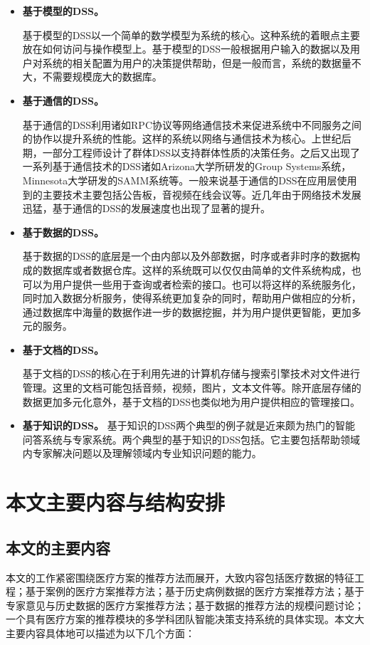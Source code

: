 \begin{itemize}
\item \textbf{基于模型的DSS。}

基于模型的DSS以一个简单的数学模型为系统的核心。这种系统的着眼点主要放在如何访问与操作模型上。基于模型的DSS一般根据用户输入的数据以及用户对系统的相关配置为用户的决策提供帮助，但是一般而言，系统的数据量不大，不需要规模庞大的数据库。
\item \textbf{基于通信的DSS。}

基于通信的DSS利用诸如RPC协议\cite{Srinivasan1995RPC}等网络通信技术来促进系统中不同服务之间的协作以提升系统的性能。这样的系统以网络与通信技术为核心。上世纪后期，一部分工程师设计了群体DSS以支持群体性质的决策任务\cite{Turoff1982Computer}。之后又出现了一系列基于通信技术的DSS诸如Arizona大学所研发的Group Systems系统，Minnesota大学研发的SAMM系统等。一般来说基于通信的DSS在应用层使用到的主要技术主要包括公告板，音视频在线会议等。近几年由于网络技术发展迅猛，基于通信的DSS的发展速度也出现了显著的提升。

\item \textbf{基于数据的DSS。}

基于数据的DSS的底层是一个由内部以及外部数据，时序或者非时序的数据构成的数据库或者数据仓库\cite{Stumme2000Conceptual}。这样的系统既可以仅仅由简单的文件系统构成，也可以为用户提供一些用于查询或者检索的接口。也可以将这样的系统服务化，同时加入数据分析服务，使得系统更加复杂的同时，帮助用户做相应的分析，通过数据库中海量的数据作进一步的数据挖掘，并为用户提供更智能，更加多元的服务。
\item \textbf{基于文档的DSS。}

基于文档的DSS的核心在于利用先进的计算机存储与搜索引擎技术对文件进行管理。这里的文档可能包括音频，视频，图片，文本文件等。除开底层存储的数据更加多元化意外，基于文档的DSS也类似地为用户提供相应的管理接口。

\item \textbf{基于知识的DSS。}
基于知识的DSS两个典型的例子就是近来颇为热门的智能问答系统与专家系统\cite{Buchanan1984Rule,Gonzalez1985The}。两个典型的基于知识的DSS包括\parencite[]{Buchanan1984Rule,Gonzalez1985The}。它主要包括帮助领域内专家解决问题以及理解领域内专业知识问题的能力。

\end{itemize}

\section{本文主要内容与结构安排}

\subsection{本文的主要内容}
本文的工作紧密围绕医疗方案的推荐方法而展开，大致内容包括医疗数据的特征工程；基于案例的医疗方案推荐方法；基于历史病例数据的医疗方案推荐方法；基于专家意见与历史数据的医疗方案推荐方法；基于数据的推荐方法的规模问题讨论；一个具有医疗方案的推荐模块的多学科团队智能决策支持系统的具体实现。本文大主要内容具体地可以描述为以下几个方面：

